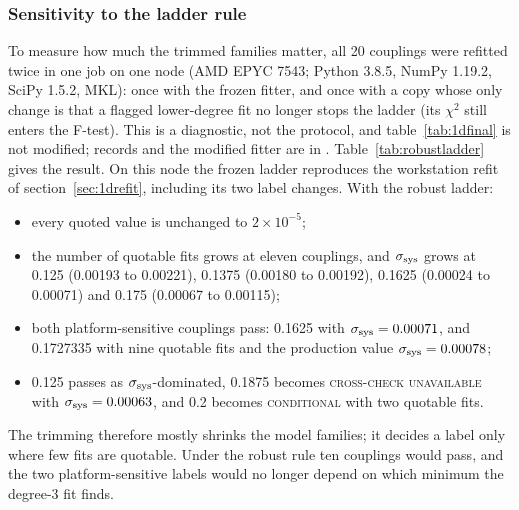 \documentclass[10pt,a4paper]{article}
\newcommand{\lbl}[1]{{\mdseries\scshape #1}}
\newcommand{\ssys}{\sigma_{\rm sys}}
\begin{document}
\subsubsection{Sensitivity to the ladder rule}\label{sec:robustladder}
To measure how much the trimmed families matter, all 20 couplings were refitted twice in one job on one node (AMD EPYC 7543; Python 3.8.5,
NumPy 1.19.2, SciPy 1.5.2, MKL): once with the frozen fitter, and once with a copy whose only change is that a flagged lower-degree fit no
longer stops the ladder (its $\chi^2$ still enters the F-test). This is a diagnostic, not the protocol, and table~\ref{tab:1dfinal} is not
modified; records and the modified fitter are in . Table~\ref{tab:robustladder} gives the result.
On this node the frozen ladder reproduces the workstation refit of section~\ref{sec:1drefit}, including its two label changes. With the
robust ladder:
\begin{itemize}
\item every quoted value is unchanged to $2\times10^{-5}$;
\item the number of quotable fits grows at eleven couplings, and $\ssys$ grows at 0.125 (0.00193 to 0.00221), 0.1375 (0.00180 to 0.00192), 0.1625
 (0.00024 to 0.00071) and 0.175 (0.00067 to 0.00115);
\item both platform-sensitive couplings pass: 0.1625 with $\ssys=0.00071$, and 0.1727335 with nine quotable fits and the production value
 $\ssys=0.00078$;
\item 0.125 passes as $\ssys$-dominated, 0.1875 becomes \lbl{cross-check unavailable} with $\ssys=0.00063$, and 0.2 becomes \lbl{conditional}
 with two quotable fits.
\end{itemize}
The trimming therefore mostly shrinks the model families; it decides a label only where few fits are quotable. Under the robust rule ten
couplings would pass, and the two platform-sensitive labels would no longer depend on which minimum the degree-3 fit finds.
\end{document}
